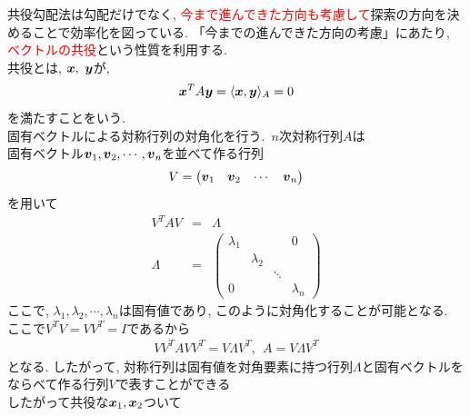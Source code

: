 \documentclass[dvipdfmx,a4j]{jsarticle}
\begin{document}
                  共役勾配法は勾配だけでなく, \textcolor{red}{今まで進んできた方向も考慮して}探索の方向を決めることで効率化を図っている. 「今までの進んできた方向の考慮」にあたり, \textcolor{red}{ベクトルの共役}という性質を利用する.\\
                  共役とは, $\mbox{\boldmath $x$},\ \mbox{\boldmath $y$}$が,
                  \begin{eqnarray*}
                    \mbox{\boldmath $x$}^{T}A\mbox{\boldmath $y$}=\langle \mbox{\boldmath $x$},\mbox{\boldmath $y$}\rangle_{A}=0
                  \end{eqnarray*}
                  を満たすことをいう.\\
                  固有ベクトルによる対称行列の対角化を行う.\ $n$次対称行列$A$は\\
                  固有ベクトル$\mbox{\boldmath $v$}_{1},\mbox{\boldmath $v$}_{2},\cdots,\mbox{\boldmath $v$}_{n}$を並べて作る行列
                  \begin{eqnarray*}
                    V=\begin{pmatrix}\mbox{\boldmath $v$}_{1}&\mbox{\boldmath $v$}_{2}&\cdots&\mbox{\boldmath $v$}_{n}\end{pmatrix}
                  \end{eqnarray*}
                  を用いて
                  \begin{eqnarray*}
                    V^{T}AV &=& \Lambda\\
                      \Lambda&=&\begin{pmatrix}\lambda_{1}&&&0\\ & \lambda_{2}&&\\ &&\ddots& \\ 0&&&\lambda_{n}\end{pmatrix}
                  \end{eqnarray*}
                  ここで, $\lambda_{1},\lambda_{2},\cdots,\lambda_{n}$は固有値であり, このように対角化することが可能となる.\\
                  ここで$V^{T}V=VV^{T}=I$であるから
                  \begin{eqnarray*}
                    VV^{T}AVV^{T}=V\Lambda V^{T},\ \ A=V\Lambda V^{T}
                  \end{eqnarray*}
                  となる. したがって, 対称行列は固有値を対角要素に持つ行列$\Lambda$と固有ベクトルをならべて作る行列$V$で表すことができる\\
                  したがって共役な$\mbox{\boldmath $x$}_{1},\mbox{\boldmath $x$}_{2}$ついて
\end{document}
